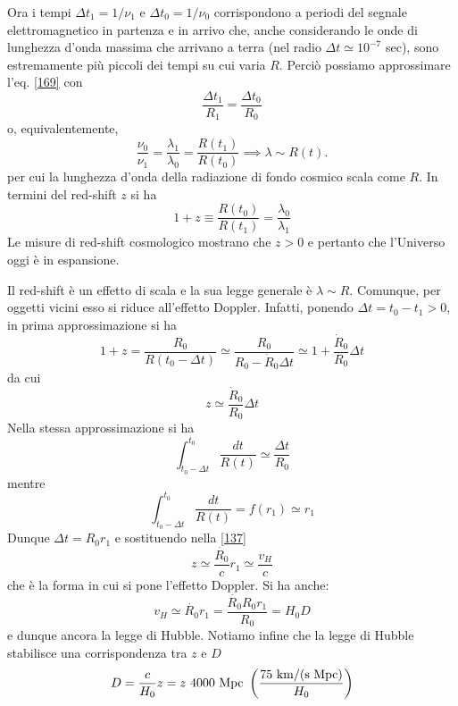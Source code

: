 Ora i tempi $\Delta t_1= 1/\nu_1$ e $\Delta t_0 = 1/\nu_0$ corrispondono a
periodi del segnale elettromagnetico in partenza e in arrivo che, anche
considerando le onde di lunghezza d'onda massima che arrivano a terra (nel radio
$\Delta t \simeq 10^{-7}$ sec), sono estremamente più piccoli dei tempi su cui
varia $R$.  Perciò possiamo approssimare l'eq. \eqref{169} con
\begin{equation}
  \frac{\Delta t_1}{R_1} = \frac{\Delta t_0}{R_0}
\end{equation}
o, equivalentemente,
\begin{equation}
  \frac{\nu_0}{\nu_1} = \frac{\lambda_1}{\lambda_0}= \frac{R(t_1)}{R(t_0)}
  \implies \lambda \sim R(t).
\end{equation}
per cui la lunghezza d'onda della radiazione di fondo cosmico scala come $R$. In
termini del red-shift $z$ si ha
\begin{equation}
1+z \equiv \frac {R(t_0)} {R(t_1)} = \frac{\lambda_0} {\lambda_1}
\end{equation}
Le misure di red-shift cosmologico mostrano che $z>0$ e pertanto che l'Universo
oggi è in espansione.

Il red-shift è un effetto di scala e la sua legge generale è $\lambda \sim R$.
Comunque, per oggetti vicini esso si riduce all'effetto Doppler.  Infatti,
ponendo $\Delta t = t_0-t_1 >0 $, in prima approssimazione si ha
\begin{equation}
  1+z = \frac{R_0} {R(t_0-\Delta t)} \simeq \frac{R_0} {R_0 -\dot{R}_0 \Delta t}
  \simeq 1 + \frac {\dot{R}_0} {R_0} \Delta t
\end{equation}
da cui
\begin{equation}
  z \simeq \frac {\dot{R}_0} {R_0} \Delta t
  \label{137}
\end{equation}
Nella stessa approssimazione si ha
\begin{equation}
  \int_{t_0-\Delta t}^{t_0} \frac{dt}{R(t)} \simeq \frac{\Delta t}{R_0}
\end{equation}
mentre
\begin{equation}
  \int_{t_0-\Delta t}^{t_0} \frac{dt}{R(t)} = f(r_1) \simeq r_1
\end{equation}
Dunque $\Delta t =  R_0 r_1$ e sostituendo nella \eqref{137}
\begin{equation}
  z \simeq \frac{\dot{R_0}}{c} r_1 \simeq \frac {v_H}{c}
\end{equation}
che è la forma in cui si pone l'effetto Doppler.  Si ha anche:
\begin{equation}
  v_H \simeq {\dot{R_0}} r_1 = \frac {\dot{R_0} R_0  r_1} {R_0} = {H_0}{D}
\end{equation}
e dunque ancora la legge di Hubble.  Notiamo infine che la legge di Hubble
stabilisce una corrispondenza tra $z$ e $D$
\begin{equation}
  D = \frac{c}{H_0} z = z ~ 4000 ~ {\rm Mpc}  ~
 \left( \frac { 75 ~{\rm km/(s ~ Mpc) }} {H_0} \right)
\end{equation}

